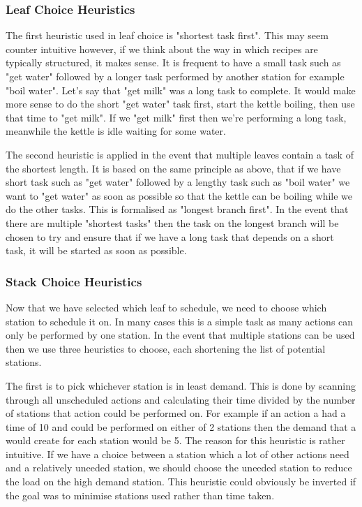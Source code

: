 \documentclass[11pt]{article}
\begin{document}
\subsubsection{Leaf Choice Heuristics}

The first heuristic used in leaf choice is "shortest task first". This may seem counter intuitive however,
if we think about the way in which recipes are typically structured, it makes sense. It is frequent
to have a small task such as "get water" followed by a longer task performed by another station
for example "boil water". Let's say that "get milk" was a long task to complete. It would make more
sense to do the short "get water" task first, start the kettle boiling, then use that time to
"get milk". If we "get milk" first then we're performing a long task, meanwhile the kettle is idle
waiting for some water.

\medbreak

The second heuristic is applied in the event that multiple leaves contain a task of the shortest length.
It is based on the same principle as above, that if we have short task such as "get water" followed
by a lengthy task such as "boil water" we want to "get water" as soon as possible so that the kettle
can be boiling while we do the other tasks. This is formalised as "longest branch first". In the
event that there are multiple "shortest tasks" then the task on the longest branch will be chosen
to try and ensure that if we have a long task that depends on a short task, it will be started
as soon as possible.

\subsubsection{Stack Choice Heuristics}

Now that we have selected which leaf to schedule, we need to choose which station to schedule it on.
In many cases this is a simple task as many actions can only be performed by one station. In the event
that multiple stations can be used then we use three heuristics to choose, each shortening the list of
potential stations.

\medbreak

The first is to pick whichever station is in least demand. This is done by scanning through all unscheduled
actions and calculating their time divided by the number of stations that action could be performed on.
For example if an action a had a time of 10 and could be performed on either of 2 stations then the demand
that a would create for each station would be 5. The reason for this heuristic is rather intuitive. If we
have a choice between a station which a lot of other actions need and a relatively uneeded station, we should
choose the uneeded station to reduce the load on the high demand station. This heuristic could obviously
be inverted if the goal was to minimise stations used rather than time taken.
\end{document}
